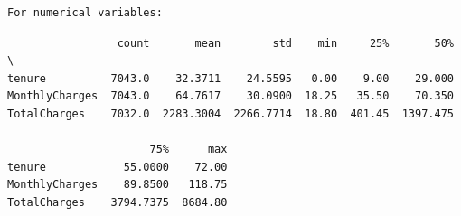 \documentclass[8pt,onecolumn,aps,pra]{revtex4-1}
\begin{document}
    
    \begin{Verbatim}[commandchars=\\\{\}]
For numerical variables:

    \end{Verbatim}

    
    \begin{verbatim}
                 count       mean        std    min     25%       50%  \
tenure          7043.0    32.3711    24.5595   0.00    9.00    29.000   
MonthlyCharges  7043.0    64.7617    30.0900  18.25   35.50    70.350   
TotalCharges    7032.0  2283.3004  2266.7714  18.80  401.45  1397.475   

                      75%      max  
tenure            55.0000    72.00  
MonthlyCharges    89.8500   118.75  
TotalCharges    3794.7375  8684.80  
    \end{verbatim}

    
    \begin{center}
    \end{center}
    { \hspace*{\fill} \\}
    
    \begin{center}
    \end{center}
    { \hspace*{\fill} \\}
    
    \begin{center}
    \end{center}
    { \hspace*{\fill} \\}
    
\end{document}
